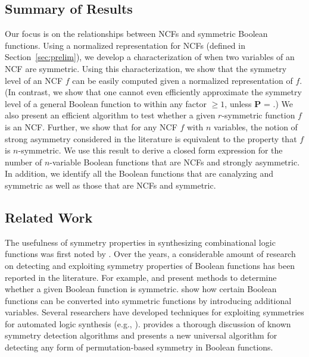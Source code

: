 
\subsection{Summary of Results}
\label{sse:contrib}

Our focus is on the relationships between 
NCFs and symmetric Boolean functions.
Using a normalized representation for NCFs 
(defined in Section~\ref{sec:prelim}), we develop a
characterization of when two variables of an NCF are symmetric.
Using this characterization, we show
that the symmetry level of an NCF $f$
can be easily computed given a normalized representation of $f$.
(In contrast, we show that 
one cannot even efficiently approximate the symmetry level of
a general Boolean function to within any factor $\geq 1$, 
unless \textbf{P} = \cnp.)
We also present an efficient algorithm to test whether a given
$r$-symmetric function $f$ is an NCF. 
Further, we show that for any NCF $f$ with $n$ variables, the notion of
strong asymmetry considered in the literature is equivalent to
the property that $f$ is $n$-symmetric.
We use this result to derive a closed form expression for the
number of $n$-variable Boolean functions
that are NCFs and strongly asymmetric.
In addition, we identify all the Boolean functions that are 
canalyzing and symmetric as well as those that 
are NCFs and symmetric.

\subsection{Related Work}
\label{sse:related}

The usefulness of symmetry properties in synthesizing 
combinational logic functions was first noted 
by \citet{Shannon-1938}.
Over the years, a considerable amount of research on detecting 
and exploiting symmetry properties 
of Boolean functions has been reported in the literature.
For example, \citet{Biswas-1970} and \citet{TM-1996} present methods 
to determine whether a given Boolean function is symmetric.
\citet*{BS-1968} show how certain Boolean functions
can be converted into symmetric functions by introducing additional
variables. 
Several researchers have developed techniques for exploiting symmetries
for automated logic synthesis 
(e.g., \cite{AP-2008,Hu-etal-2008,KS-2000,Darga-etal-2008}).
\citet{Maurer-2015} provides a thorough discussion of known
symmetry detection algorithms and presents a new universal algorithm 
for detecting any form of permutation-based symmetry in Boolean functions. 


